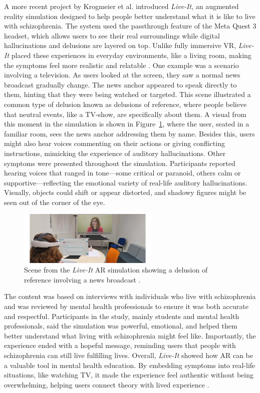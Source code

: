 A more recent project by Krogmeier et al. introduced \textit{Live-It}, an augmented reality  simulation designed to help people better understand what it is like to live with schizophrenia. The system used the passthrough feature of the Meta Quest 3 headset, which allows users to see their real surroundings while digital hallucinations and delusions are layered on top. Unlike fully immersive VR, \textit{Live-It} placed these experiences in everyday environments, like a living room, making the symptoms feel more realistic and relatable \cite{Krogmeier2024}. One example was a scenario involving a television. As users looked at the screen, they saw a normal news broadcast gradually change. The news anchor appeared to speak directly to them, hinting that they were being watched or targeted. This scene illustrated a common type of delusion known as delusions of reference, where people believe that neutral events, like a TV-show, are specifically about them.  A visual from this moment in the simulation is shown in Figure~\ref{fig:liveit_tv}, where the user, seated in a familiar room, sees the news anchor addressing them by name. Besides this, users might also hear voices commenting on their actions or giving conflicting instructions, mimicking the experience of auditory hallucinations. Other symptoms were presented throughout the simulation. Participants reported hearing voices that ranged in tone—some critical or paranoid, others calm or supportive—reflecting the emotional variety of real-life auditory hallucinations. Visually, objects could shift or appear distorted, and shadowy figures might be seen out of the corner of the eye. 

\begin{figure}[H]
  \centering
  \includegraphics[width=0.6\textwidth]{../../Figures/live-it.jpeg}
  \caption{Scene from the \textit{Live-It} AR simulation showing a delusion of reference involving a news broadcast \cite{Krogmeier2024}.}
  \label{fig:liveit_tv}
\end{figure}

The content was based on interviews with individuals who live with schizophrenia and was reviewed by mental health professionals to ensure it was both accurate and respectful. Participants in the study, mainly students and mental health professionals, said the simulation was powerful, emotional, and helped them better understand what living with schizophrenia might feel like. Importantly, the experience ended with a hopeful message, reminding users that people with schizophrenia can still live fulfilling lives. Overall, \textit{Live-It} showed how AR can be a valuable tool in mental health education. By embedding symptoms into real-life situations, like watching TV, it made the experience feel authentic without being overwhelming, helping users connect theory with lived experience \cite{Krogmeier2024}.



